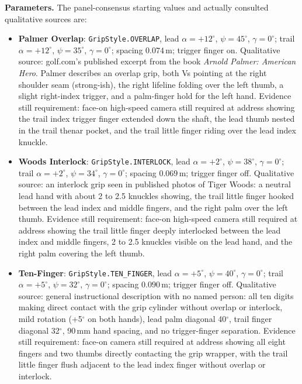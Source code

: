 \documentclass[11pt,a4paper]{article}
\begin{document}
\textbf{Parameters.} The panel-consensus starting values and actually consulted
qualitative sources are:
\begin{itemize}[nosep]
  \item \textbf{Palmer Overlap}: \texttt{GripStyle.OVERLAP}, lead
    $\alpha=+12^{\circ}$, $\psi=45^{\circ}$, $\gamma=0^{\circ}$; trail
    $\alpha=+12^{\circ}$, $\psi=35^{\circ}$, $\gamma=0^{\circ}$; spacing
    $0.074$\,m; trigger finger on. Qualitative source: golf.com's published
    excerpt from the book \emph{Arnold Palmer: American Hero}. Palmer describes
    an overlap grip, both Vs pointing at the right shoulder seam (strong-ish),
    the right lifeline folding over the left thumb, a slight right-index trigger,
    and a palm-finger hold for the left hand. Evidence still requirement: face-on
    high-speed camera still required at address showing the trail index trigger
    finger extended down the shaft, the lead thumb nested in the trail thenar pocket,
    and the trail little finger riding over the lead index knuckle.
  \item \textbf{Woods Interlock}: \texttt{GripStyle.INTERLOCK}, lead
    $\alpha=+2^{\circ}$, $\psi=38^{\circ}$, $\gamma=0^{\circ}$; trail
    $\alpha=+2^{\circ}$, $\psi=34^{\circ}$, $\gamma=0^{\circ}$; spacing
    $0.069$\,m; trigger finger off. Qualitative source: an interlock grip seen
    in published photos of Tiger Woods: a neutral lead hand with about 2 to 2.5
    knuckles showing, the trail little finger hooked between the lead index and
    middle fingers, and the right palm over the left thumb. Evidence still
    requirement: face-on high-speed camera still required at address showing
    the trail little finger deeply interlocked between the lead index and middle
    fingers, 2 to 2.5 knuckles visible on the lead hand, and the right palm
    covering the left thumb.
  \item \textbf{Ten-Finger}: \texttt{GripStyle.TEN\_FINGER}, lead
    $\alpha=+5^{\circ}$, $\psi=40^{\circ}$, $\gamma=0^{\circ}$; trail
    $\alpha=+5^{\circ}$, $\psi=32^{\circ}$, $\gamma=0^{\circ}$; spacing
    $0.090$\,m; trigger finger off. Qualitative source: general instructional
    description with no named person: all ten digits making direct contact with
    the grip cylinder without overlap or interlock, mild rotation (+5$^{\circ}$ on
    both hands), lead palm diagonal 40$^{\circ}$, trail finger diagonal 32$^{\circ}$,
    90\,mm hand spacing, and no trigger-finger separation. Evidence still
    requirement: face-on camera still required at address showing all eight fingers
    and two thumbs directly contacting the grip wrapper, with the trail little
    finger flush adjacent to the lead index finger without overlap or interlock.
\end{itemize}
\end{document}
